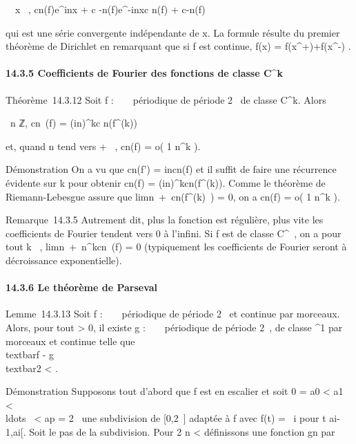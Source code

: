 \forall~~x \in {}~,
\textbar{}cn(f)e^inx + c
-n(f)e^-inx\textbar{}\leq\textbar{}c n(f)\textbar{}
+ \textbar{}c-n(f)\textbar{}

qui est une série convergente indépendante de x. La formule résulte du
premier théorème de Dirichlet en remarquant que si f est continue, f(x)
= f(x^+)+f(x^-)  .

\paragraph{14.3.5 Coefficients de Fourier des fonctions de classe
C^k}

Théorème~14.3.12 Soit f : ~ \rightarrow~  périodique de période 2\pi~ de classe
C^k. Alors

\forall~n \in ℤ, cn~(f) =
(in)^kc n(f^(k))

et, quand \textbar{}n\textbar{} tend vers + \infty~, cn(f) = o( 1
\over n^k ).

Démonstration On a vu que cn(f') = incn(f) et il
suffit de faire une récurrence évidente sur k pour obtenir
cn(f) = (in)^kcn(f^(k)). Comme
le théorème de Riemann-Lebesgue assure que
lim\textbar{}n\textbar{}\rightarrow~+\infty~cn(f^(k)~)
= 0, on a cn(f) = o( 1 \over n^k
).

Remarque~14.3.5 Autrement dit, plus la fonction est régulière, plus vite
les coefficients de Fourier tendent vers 0 à l'infini. Si f est de
classe C^\infty~, on a pour tout k \in {}~,
lim\textbar{}n\textbar{}\rightarrow~+\infty~n^kcn~(f)
= 0 (typiquement les coefficients de Fourier seront à décroissance
exponentielle).

\paragraph{14.3.6 Le théorème de Parseval}

Lemme~14.3.13 Soit f : ~ \rightarrow~  périodique de période 2\pi~ et continue par
morceaux. Alors, pour tout \epsilon \textgreater{} 0, il existe g : ~ \rightarrow~ 
périodique de période 2\pi~, de classe ^1 par morceaux et
continue telle que \\textbar{}f -
g\\textbar{}2 \textless{} \epsilon.

Démonstration Supposons tout d'abord que f est en escalier et soit 0 =
a0 \textless{} a1 \textless{}
\\ldots~ \textless{}
ap = 2\pi~ une subdivision de {[}0,2\pi~{]} adaptée à f avec f(t) =
\lambda~i pour t \in{]}ai-1,ai{[}. Soit \delta le pas de
la subdivision. Pour  2 \over n \textless{} \eta
définissons une fonction gn par

